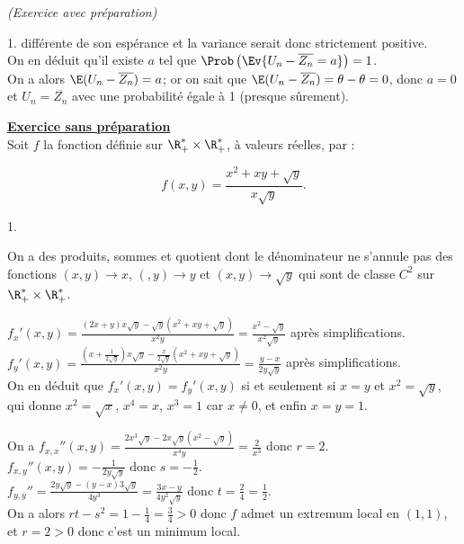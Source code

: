 \documentclass[11pt]{article}%
\begin{document}
\begin{exercice}{\it (Exercice avec préparation)}
\begin{noliste}{1.}
 différente de son espérance et la variance serait donc
 strictement positive. \\
 On en déduit qu'il existe $a$ tel que $\Prob\left(\Ev{ U_{n} -
\overline{Z_{n}} = 
 a }\right) = 1$. \\
 On a alors $\E( U_{n} - \overline{Z_{n}} ) = a$; or on sait que
 $\E(U_{n} - \overline{Z_{n}} ) = \theta - \theta = 0$, donc $a = 0$ et
 $U_{n} = \overline{Z_{n}}$ avec une probabilité égale à 1 (presque
 sûrement). 
 \end{noliste}
 \noindent \textbf{\underline{Exercice sans préparation}} \\
 Soit $f$ la fonction définie sur $\R_+^* \times \R_+^*$, à valeurs
 réelles, par : 
 
\[
 f(x,y) = \frac{x^{2} + xy + \sqrt{y} }{x \sqrt{y} }. 
\]
 \begin{noliste}{1.}
 \setlength{\itemsep}{4mm}
 \item On a des produits, sommes et quotient dont le dénominateur ne
 s'annule pas des fonctions $(x,y) \rightarrow x$, $(,y)
 \rightarrow y$ et $(x,y) \rightarrow \sqrt{y}$ qui sont de classe
 $C^{2}$ sur $\R_+^* \times \R_+^*$. 
 \item $f_{x}'(x,y) = \frac{(2x + y ) x \sqrt{y} - \sqrt{y} (x^{2} + xy
 + \sqrt{y} ) }{x^{2} y} = \frac{x^{2} - \sqrt{y} }{x^{2}
 \sqrt{y}}$ après simplifications. \\
 $f_{y}'(x,y) = \frac{\left(x + \frac{1}{2 \sqrt{y} } \right) x
 \sqrt{y} - \frac{x}{2 \sqrt{y} } ( x^{2} + xy + \sqrt{y} ) }{x^{2}
 y} = \frac{ y - x }{2 y \sqrt{y}}$ après simplifications. \\
 On en déduit que $f_{x}'(x,y) = f_{y}'(x,y)$ si et seulement si $x = 
 y$ et $x^{2} = \sqrt{y}$, qui donne $x^{2} = \sqrt{x}$, $x^{4} = x$,
 $x^{3} = 1$ car $x \neq 0$, et enfin $x = y = 1$. \\
 \item On a $f_{x,x}'' (x,y) = \frac{ 2x^{3} \sqrt{y} - 2 x \sqrt{y}
 (x^{2} - \sqrt{y}) }{ x^{4} y} = \frac{ 2 }{ x^{3}}$ donc $r = 
 2$. \\
 $f_{x,y}'' (x,y) = -\frac{ 1}{2 y \sqrt{y} }$ donc $s = -
\frac{1}{2}$. \\
 $f_{y,y}'' = \frac{ 2 y \sqrt{y} - (y-x) 3 \sqrt{y} }{4 y^{3}} = 
 \frac{3x - y}{4 y^{2} \sqrt{y}} $ donc $t = \frac{2}{4} = 
 \frac{1}{2}$. \\
 On a alors $rt - s^{2} = 1 - \frac{1}{4} = \frac{3}{4} > 0$ donc
 $f$ admet un extremum local en $(1,1)$, et $r = 2 > 0$ donc c'est
 un minimum local.
 \end{noliste}
 \end{exercice}

 \newpage

 
\end{document}
